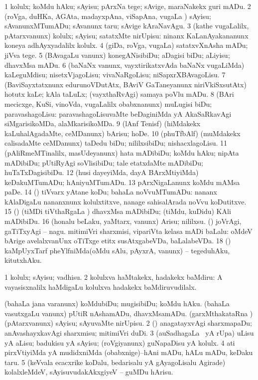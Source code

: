 \bentry
{}
\gl{\sakirx}
\bmng
\bnum
\num{1} kolulx; koMdu hAku; sAyisu; pArxNa tege; sAvige, maraNakekx guri mADu. 
\num{2} (roVga, duHKa, AGAta, madayxpAna, viSapAna, \mo vugaLa \vi) sAyisu; sAvanunxMTumADu; sAvanunx taru; sAvige kAraNavAgu. 
\num{3} (kathe \mo vugaLalilx, pAtarxvanunx) kolulx; sAyisu; satatxMte nirUpisu:  ninanx KaLanAyakananunx koneya adhAyxyadalilx kolulx. 
\num{4} (giDa, roVga, \mo vugaLa) satatxvXnAsha mADu; jiVva tege. 
\num{5} (BAvagaLu \mo vanunx) konegANisibiDu; aDagisi biDu; aLiyisu; dhavxMsa mADu. 
\num{6} (baNaNx \mo vanunx, vayxtirikatxvAda baNaNx \mo vugaLiMda) kaLeguMdisu; nisetxVjagoLisu; vivaNaRgoLisu; niSapxrXBAvagoLisu. 
\num{7} (BaviSayxtatxnunx edurunoVDutAtx, BAviV GaTaneyanunx niriVkiSxsutAtx) hotutx kaLe; kAla taLuLx; (vayxthaRvAgi) samaya poVlu mADu. 
\num{8} (BAri mecicxge, KuSi, vinoVda, \mo vugaLalilx obabxnanunx) muLugisi biDu; paravashagoLisu:  paravashagoLisuvaMte beDaginiMda yA AkaSaRkavAgi siMgarisikoMDa, alaMkarisikoMDa. 
\num{9} (lAnf Tenisf) (hiMdakekx kaLuhalAgadaMte, ceMDanunx) bArisu; hoDe. 
\num{10} (phuTfbAlf) (muMdakekx calisadaMte ceMDanunx) taDedu biDu; nililxsibiDu; nishacxlagoLisu. 
\num{11} (pAliRmeMTinalilx, masUdeyanunx) hata mADibiDu; koMdu hAku; nipAta mADibiDu; pUtiRyAgi soVlisibiDu; tale etatxdaMte mADibiDu; huTaTxDagisibiDu. 
\num{12} (husi dayeyiMda, dayA BArxMtiyiMda) keDakuMTumADu; hAniyuMTumADu. 
\num{13} pArxNigaLanunx koMdu mAMsa paDe. 
\num{14} (\AmA) tiVvarx yAtane koDu; bahaLa noVvuMTumADu:  nananx kAlaDigaLu nananxnunx kolulxtitxve, nanage sahisalArada noVvu koDutitxve. 
\num{15} (\AmA) (tiMDi tiVthaRgaLa \vi) dhavxMsa mADibiDu; (tiMdu, kuDidu) KAli mADibiDu. 
\num{16} (honalu beLaku, yaMtarx, \mo vanunx) Arisu; nililxsu. 
 (\AtAmx) 
\banum
{} joVrAgi, gaTiTxyAgi -- nagu. 
 mitimiVri sharxmisi, vipariVta kelasa mADi baLalu:  oMdeV bArige avelalxvanUnx oTiTxge etitx susAtxgabeVDa, baLalabeVDa. 
\eanum
\numie
\num{18} (\AmA) kaMpUyxTarf pheYlfniMda(oMdu sAlu, pAyxrA, \mo vanunx) -- tegeduhAku, kitutxhAku. 
\enum
\emng

\noindent
\gl{\akirx}
\bmng
\bnum
\num{1} kolulx; sAyisu; vadhisu. 
\num{2} kolulxva haMtakekx, hadakekx baMdiru:  A vayasisxnalilx haMdigaLu kolulxva hadakekx baMdiruvudilalx. 
\enum
\emng

\noindent
\gl{\pagu}
\bmng
\bnum
{}  
\banum
{} (bahaLa jana \mo varanunx) koMdubiDu; mugisibiDu; koMdu hAku. 
 (bahaLa vasutxgaLu \mo vanunx) pUtiR nAshamADu, dhavxMsamADu. 
 (garxMthakataRna \vi) (pAtarxvanunx) sAyisu; sAyuvaMte nirUpisu. 
\eanum
\numie
\num{2}  (\AmA) anagatayxvAgi sharxmapaDu; anAvashayxkavAgi sharxmisu; mitimiVri duDi. 
\num{3}  (auSadhagaLa \vi\ yA rUpa) uLisu yA aLisu; badukisu yA sAyisu; (roVgiyanunx) guNapaDisu yA kolulx. 
\num{4}  ati pirxVtiyiMda yA mudidxniMda (obabxnige)--hAni mADu, hALu mADu, keDaku taru. 
\num{5}  (keVvala ecacxrike koDalu, bedarisalu yA gAyagoLisalu Agirade) kolalxleMdeV, sAyisuvudakAkxgiyeV -- guMDu hArisu. 
\enum
\emng

